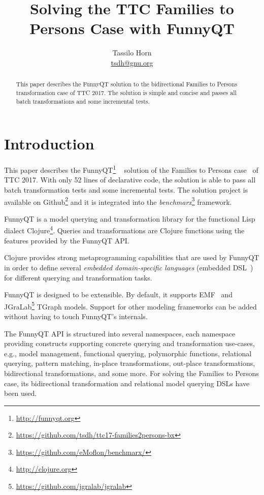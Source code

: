 \documentclass[a4paper]{article}
\title{Solving the TTC Families to Persons Case with FunnyQT}
\author{Tassilo Horn\\ \href{mailto:tsdh@gnu.org}{tsdh@gnu.org}}
\begin{document}
\maketitle

\begin{abstract}
  This paper describes the FunnyQT solution to the bidirectional Families to
  Persons transformation case of TTC 2017.  The solution is simple and concise
  and passes all batch transformations and some incremental tests.
\end{abstract}


\section{Introduction}
\label{sec:introduction}

This paper describes the FunnyQT\footnote{\url{http://funnyqt.org}}
~\cite{diss,funnyqt-icgt15} solution of the Families to Persons
case~\cite{f2p-case-desc} of TTC 2017.  With only 52 lines of declarative code,
the solution is able to pass all batch transformation tests and some
incremental tests.  The solution project is available on
Github\footnote{\url{https://github.com/tsdh/ttc17-families2persons-bx}} and it
is integrated into the
\emph{benchmarx}\footnote{\url{https://github.com/eMoflon/benchmarx/}}
framework.

FunnyQT is a model querying and transformation library for the functional Lisp
dialect Clojure\footnote{\url{http://clojure.org}}.  Queries and
transformations are Clojure functions using the features provided by the
FunnyQT API.

Clojure provides strong metaprogramming capabilities that are used by FunnyQT
in order to define several \emph{embedded domain-specific languages} (embedded
DSL~\cite{book:Fowler2010DSL}) for different querying and transformation tasks.

FunnyQT is designed to be extensible.  By default, it supports
EMF~\cite{Steinberg2008EEM} and
JGraLab\footnote{\url{https://github.com/jgralab/jgralab}} TGraph models.
Support for other modeling frameworks can be added without having to touch
FunnyQT's internals.

The FunnyQT API is structured into several namespaces, each namespace providing
constructs supporting concrete querying and transformation use-cases, e.g.,
model management, functional querying, polymorphic functions, relational
querying, pattern matching, in-place transformations, out-place
transformations, bidirectional transformations, and some more.  For solving the
Families to Persons case, its bidirectional transformation and relational model
querying DSLs have been used.
\end{document}
